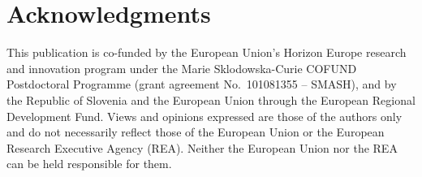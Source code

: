 \documentclass[runningheads]{llncs}
\begin{document}
 \section*{Acknowledgments}
  This publication is co-funded by the European Union’s Horizon Europe research and innovation program under the Marie Sklodowska-Curie COFUND Postdoctoral Programme (grant agreement No.~101081355 -- SMASH), and by the Republic of Slovenia and the European Union through the European Regional Development Fund. Views and opinions expressed are those of the authors only and do not necessarily reflect those of the European Union or the European Research Executive Agency (REA). Neither the European Union nor the REA can be held responsible for them.

	
	
 
\end{document}
